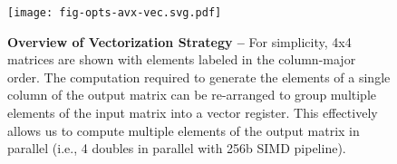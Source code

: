 
\begin{figure}

  \centering
  \texttt{[image: fig-opts-avx-vec.svg.pdf]}

  \caption{\textbf{Overview of Vectorization Strategy --} For simplicity,
    4x4 matrices are shown with elements labeled in the column-major
    order. The computation required to generate the elements of a single
    column of the output matrix can be re-arranged to group multiple
    elements of the input matrix into a vector register. This effectively
    allows us to compute multiple elements of the output matrix in
    parallel (i.e., 4 doubles in parallel with 256b SIMD pipeline).}

  \label{fig-opts-avx-vec}

\end{figure}

